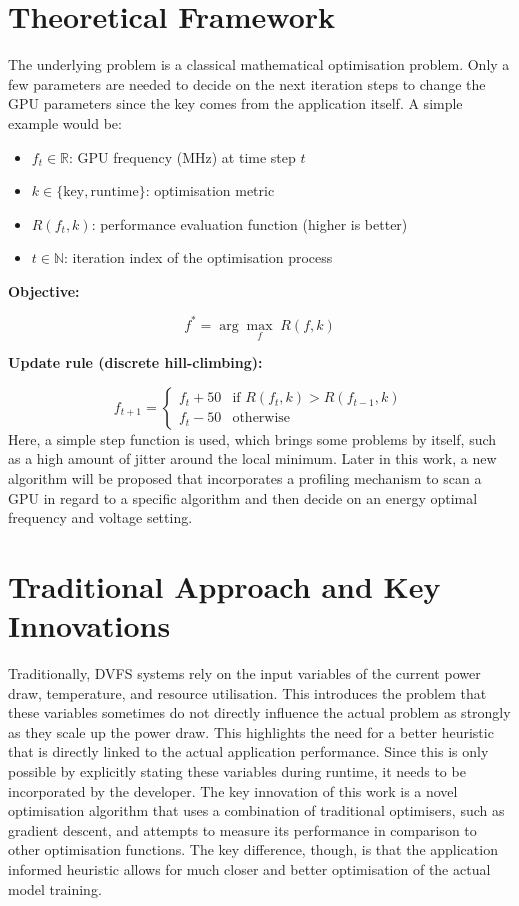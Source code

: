 \documentclass[12pt]{article}
\begin{document}
\section{Theoretical Framework}

The underlying problem is a classical mathematical optimisation problem. Only a few parameters are needed to decide on the next iteration steps to change the GPU parameters since the key comes from the application itself. A simple example would be:
\begin{itemize}
    \item $f_t \in \mathbb{R}$: GPU frequency (MHz) at time step $t$
    \item $k \in \{\text{key}, \text{runtime}\}$: optimisation metric
    \item $R(f_t, k)$: performance evaluation function (higher is better)
    \item $t \in \mathbb{N}$: iteration index of the optimisation process
\end{itemize}

\textbf{Objective:}

\[
f^{*} = \arg\max_f \; R(f, k)
\]

\textbf{Update rule (discrete hill-climbing):}

\[
f_{t+1} =
\begin{cases}
f_t + 50 & \text{if } R(f_t, k) > R(f_{t-1}, k) \\
f_t - 50 & \text{otherwise}
\end{cases}
\]
Here, a simple step function is used, which brings some problems by itself, such as a high amount of jitter around the local minimum. Later in this work, a new algorithm will be proposed that incorporates a profiling mechanism to scan a GPU in regard to a specific algorithm and then decide on an energy optimal frequency and voltage setting.
\section{Traditional Approach and Key Innovations}
Traditionally, DVFS systems rely on the input variables of the current power draw, temperature, and resource utilisation. This introduces the problem that these variables sometimes do not directly influence the actual problem as strongly as they scale up the power draw. This highlights the need for a better heuristic that is directly linked to the actual application performance. Since this is only possible by explicitly stating these variables during runtime, it needs to be incorporated by the developer. The key innovation of this work is a novel optimisation algorithm that uses a combination of traditional optimisers, such as gradient descent, and attempts to measure its performance in comparison to other optimisation functions. The key difference, though, is that the application informed heuristic allows for much closer and better optimisation of the actual model training.
\end{document}
